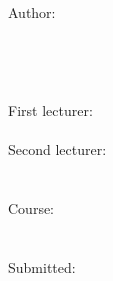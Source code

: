 \begin{titlepage}
~\\
~\\
~\\
~\\
\begin{figure}
\hfill
\subfigure{\documentLogo}
\end{figure}
\begin{center}
~\\
~\\
~\\
\documentType\\
~\\
~\\
\Huge\documentTitle\normalsize\\
~\\
\Large\documentSubTitle\normalsize\\
~\\
~\\
~\\
~\\
~\\
~\\
Author:\\
\documentAuthor\\
\documentAuthorStreet\\
\documentAuthorPostalcode \documentAuthorCity\\
~\\
First lecturer:\\
\documentFirstValidator\\
Second lecturer:\\
\documentSecondtValidator\\
~\\
Course:\\
\documentUniCourse\\
~\\
Submitted:\\
\documentDate\\
\end{center}
\end{titlepage}
